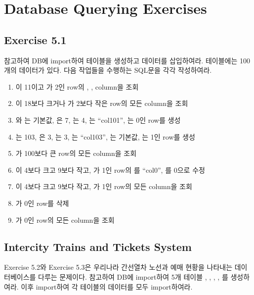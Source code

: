 \section{Database Querying Exercises}\label{sect:database-querying-exercises}

\subsection*{Exercise 5.1}

\을 참고하여 DB에 \을 import하여 테이블을 생성하고 데이터를 삽입하여라.  테이블에는 100개의 데이터가 있다. 다음 작업들을 수행하는 SQL문을 각각 작성하여라.

\begin{enumerate}
    \item {}이 11이고 가 2인 row의 , ,  column을 조회
    \item {}이 18보다 크거나 가 2보다 작은 row의 모든 column을 조회
    \item {}와 는 기본값, 은 7, 는 4, 는 ``col101'', 는 0인 row를 생성
    \item {}는 103, 은 3, 는 3, 는 ``col103'', 는 기본값, 는 1인 row를 생성
    \item {}가 100보다 큰 row의 모든 column을 조회
    \item {}이 4보다 크고 9보다 작고, 가 1인 row의 를 ``col0'', 를 0으로 수정
    \item {}이 4보다 크고 9보다 작고, 가 1인 row의 모든 column을 조회
    \item {}가 0인 row를 삭제
    \item {}가 0인 row의 모든 column을 조회
\end{enumerate}

\subsection*{Intercity Trains and Tickets System}

Exercise 5.2와 Exercise 5.3은 우리나라 간선열차 노선과 예매 현황을 나타내는 데이터베이스를 다루는 문제이다. \을 참고하여 DB에 \를 import하여 5개 테이블 , , , , 를 생성하여라. 이후 \를 import하여 각 테이블의 데이터를 모두 import하여라.

